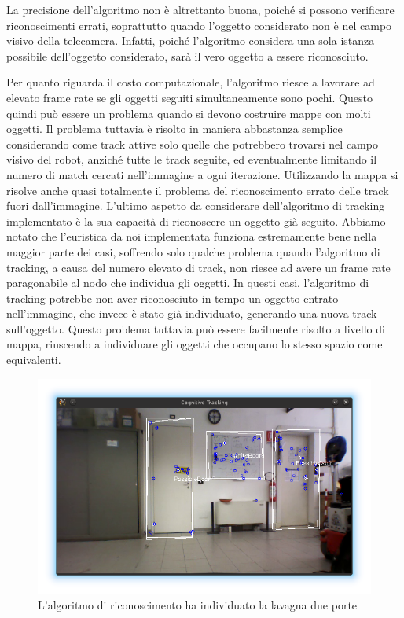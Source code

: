 La precisione dell'algoritmo non è altrettanto buona, poiché si possono verificare riconoscimenti errati, soprattutto quando l'oggetto considerato non è nel campo visivo della telecamera. Infatti, poiché l'algoritmo considera una sola istanza possibile dell'oggetto considerato, sarà il vero oggetto a essere riconosciuto.

Per quanto riguarda il costo computazionale, l'algoritmo riesce a lavorare ad elevato frame rate se gli oggetti seguiti simultaneamente sono pochi. Questo quindi può essere un problema quando si devono costruire mappe con molti oggetti. Il problema tuttavia è risolto in maniera abbastanza semplice considerando come track attive solo quelle che potrebbero trovarsi nel campo visivo del robot, anziché tutte le track seguite, ed eventualmente limitando il numero di match cercati nell'immagine a ogni iterazione. Utilizzando la mappa si risolve anche quasi totalmente il problema del riconoscimento errato delle track fuori dall'immagine.
L'ultimo aspetto da considerare dell'algoritmo di tracking implementato è la sua capacità di riconoscere un oggetto già seguito.
Abbiamo notato che l'euristica da noi implementata funziona estremamente bene nella maggior parte dei casi, soffrendo solo qualche problema quando l'algoritmo di tracking, a causa del numero elevato di track, non riesce ad avere un frame rate paragonabile al nodo che individua gli oggetti. In questi casi, l'algoritmo di tracking potrebbe non aver riconosciuto in tempo un oggetto entrato nell'immagine, che invece è stato già individuato, generando una nuova track sull'oggetto. Questo problema tuttavia può essere facilmente risolto a livello di mappa, riuscendo a individuare gli oggetti che occupano lo stesso spazio come equivalenti.

\begin{figure}[ht]
  \includegraphics[width=\textwidth]{immagini/risultati/tracker1}
  \caption{L'algoritmo di riconoscimento ha individuato la lavagna due porte}
  \label{fig:tracker1}
\end{figure}

